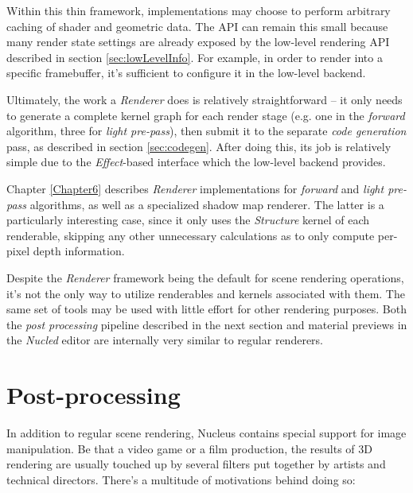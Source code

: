 Within this thin framework, implementations may choose to perform arbitrary caching of shader and geometric data. The API can remain this small because many render state settings are already exposed by the low-level rendering API described in section \ref{sec:lowLevelInfo}. For example, in order to render into a specific framebuffer, it's sufficient to configure it in the low-level backend.

Ultimately, the work a \emph{Renderer} does is relatively straightforward -- it only needs to generate a complete kernel graph for each render stage (e.g. one in the \emph{forward} algorithm, three for \emph{light pre-pass}), then submit it to the separate \emph{code generation} pass, as described in section \ref{sec:codegen}. After doing this, its job is relatively simple due to the \emph{Effect}-based interface which the low-level backend provides.

Chapter \ref{Chapter6} describes \emph{Renderer} implementations for \emph{forward} and \emph{light pre-pass} algorithms, as well as a specialized shadow map renderer. The latter is a particularly interesting case, since it only uses the \emph{Structure} kernel of each renderable, skipping any other unnecessary calculations as to only compute per-pixel depth information.

Despite the \emph{Renderer} framework being the default for scene rendering operations, it's not the only way to utilize renderables and kernels associated with them. The same set of tools may be used with little effort for other rendering purposes. Both the \emph{post processing} pipeline described in the next section and material previews in the \emph{Nucled} editor are internally very similar to regular renderers.

\section{Post-processing}
\label{sec:PostProcessing}

In addition to regular scene rendering, Nucleus contains special support for image manipulation. Be that a video game or a film production, the results of 3D rendering are usually touched up by several filters put together by artists and technical directors. There's a multitude of motivations behind doing so:

